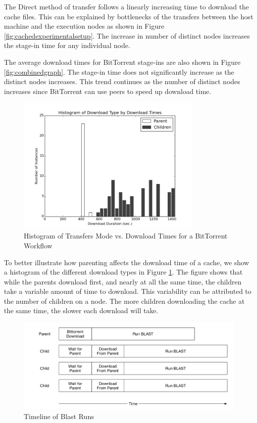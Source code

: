 The Direct method of transfer follows a linearly increasing time to download the cache files.  This can be explained by bottlenecks of the transfers between the host machine and the execution nodes as shown in Figure \ref{fig:cachedexperimentalsetup}.  The increase in number of distinct nodes increases the stage-in time for any individual node.

The average download times for BitTorrent stage-ins are also shown in Figure \ref{fig:combinedgraph}.  The stage-in time does not significantly increase as the distinct nodes increases.  This trend continues as the number of distinct nodes increases since BitTorrent can use peers to speed up download time.

\begin{figure}[h!t]
\centering
\includegraphics[width=0.8\textwidth]{images/modes_vs_downloadtimes-grayscale.png}
\caption{Histogram of Transfers Mode vs. Download Times for a BitTorrent Workflow}
\label{fig:histmethod}
\end{figure}

To better illustrate how parenting affects the download time of a cache, we show a histogram of the different download types in Figure \ref{fig:histmethod}.  The figure shows that while the parents download first, and nearly at all the same time, the children take a variable amount of time to download.  This variability can be attributed to the number of children on a node.  The more children downloading the cache at the same time, the slower each download will take. 

 

\begin{figure}[h!t]
\centering
\includegraphics[width=\textwidth]{images/BlastRunOverview.pdf}
\caption{Timeline of Blast Runs}
\label{fig:timelineblastruns}
\end{figure}

